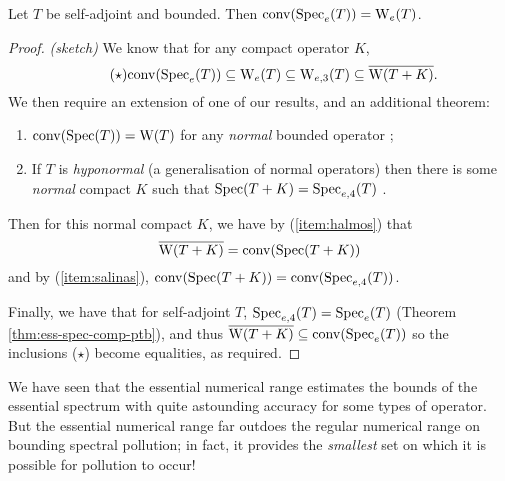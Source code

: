 \documentclass[../main.tex]{subfiles}
\begin{document}
\begin{corollary}
  Let $T$ be self-adjoint and bounded. Then $\mathrm{conv}(\mathrm{Spec}_e(T)) = \mathrm{W}_e(T)$.
\end{corollary}
\begin{proof}\emph{(sketch)}
We know that for any compact operator $K$,
  \begin{equation*}
  \tag{$\star$}
  \label{eqn:inclusions}
  \mathrm{conv}(\mathrm{Spec}_e(T)) \subseteq \mathrm{W}_e(T) \subseteq \mathrm{W}_{e,3}(T) \subseteq \overline{\mathrm{W}(T+K)}.
  \end{equation*}
We then require an extension of one of our results, and an additional theorem:
  \begin{enumerate}
    \item\label{item:halmos} $\mathrm{conv}(\mathrm{Spec}(T)) = \mathrm{W}(T)$ for any \emph{normal} bounded operator \cite{halmos1982hilbert};
    \item\label{item:salinas} If $T$ is \emph{hyponormal} (a generalisation of normal operators) then there is some 
      \emph{normal} compact $K$ such that $\mathrm{Spec}(T+K) = \mathrm{Spec}_{e,4}(T)$ \cite{salinas1972operators}.
  \end{enumerate}

Then for this normal compact $K$, we have by (\ref{item:halmos}) that
  $$\overline{\mathrm{W}(T+K)} = \mathrm{conv}(\mathrm{Spec}(T+K))$$
  and by (\ref{item:salinas}), $\mathrm{conv}(\mathrm{Spec}(T+K)) = \mathrm{conv}(\mathrm{Spec}_{e,4}(T))$.

  Finally, we have that for self-adjoint $T$, $\mathrm{Spec}_{e,4}(T) = \mathrm{Spec}_e(T)$
  (Theorem \ref{thm:ess-spec-comp-ptb}), and %
  thus $\overline{\mathrm{W}(T+K)} \subseteq \mathrm{conv}(\mathrm{Spec}_e(T))$
  so the inclusions ($\star$) become equalities, as required.
\end{proof}

We have seen that the essential numerical range estimates the bounds of the
essential spectrum with quite astounding accuracy for some types of operator.
But the essential numerical range far outdoes the regular numerical range on
bounding spectral pollution; in fact, it provides the \emph{smallest} set on which
it is possible for pollution to occur! 
\end{document}
